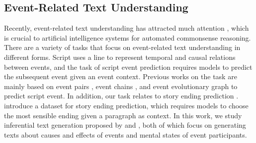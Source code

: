 \documentclass[11pt,a4paper]{article}
\begin{document}
\subsection{Event-Related Text Understanding}
Recently, event-related text understanding has attracted much attention \cite{chambers2008unsupervised,segers2016event,wang2017integrating,li2018constructing,rashkin2018event2mind,sap2019atomic, guo2020inferential}, which is crucial to artificial intelligence systems for automated commonsense reasoning.
There are a variety of tasks that focus on event-related text understanding in different forms.
Script \cite{schank1977scripts} uses a line to represent temporal and causal relations between events, and 
the task of script event prediction \cite{chambers2008unsupervised} requires models to predict the subsequent event given an event context. Previous works on the task are mainly based on event pairs \cite{chambers2008unsupervised,granroth2016happens}, event chains \cite{wang2017integrating}, and event evolutionary graph \cite{li2018constructing} to predict script event. 
In addition, our task relates to story ending prediction \cite{sharma2018tackling,mostafazadeh2016corpus,zellers2018swag}.
\citet{mostafazadeh2016corpus} introduce a dataset for story ending prediction, which requires models to choose the most sensible ending given a paragraph as context.
In this work, we study inferential text generation proposed by \citet{rashkin2018event2mind} and \citet{sap2019atomic}, both of which focus on generating texts about causes and effects of events and mental \mbox{states} of event participants. 
\end{document}
